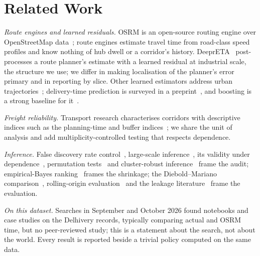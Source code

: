 \section{Related Work}\label{sec:related}

\textit{Route engines and learned residuals.} OSRM is an open-source routing engine over OpenStreetMap data~\cite{luxen2011real}; route engines estimate travel time from road-class speed profiles and know nothing of hub dwell or a corridor's history. DeeprETA~\cite{hu2022deepreta} post-processes a route planner's estimate with a learned residual at industrial scale, the structure we use; we differ in making localisation of the planner's error primary and in reporting by slice. Other learned estimators address urban trajectories~\cite{wang2018learning,wang2018deeptte,derrowpinion2021eta}; delivery-time prediction is surveyed in a preprint~\cite{wen2023survey}, and boosting is a strong baseline for it~\cite{khiari2020boosting}.

\textit{Freight reliability.} Transport research characterises corridors with descriptive indices such as the planning-time and buffer indices~\cite{fhwa2005reliability,jones2005measuring,margiotta2013shrp2}; we share the unit of analysis and add multiplicity-controlled testing that respects dependence.

\textit{Inference.} False discovery rate control~\cite{benjamini1995controlling}, large-scale inference~\cite{efron2010large}, its validity under dependence~\cite{benjamini2001control}, permutation tests~\cite{phipson2010permutation} and cluster-robust inference~\cite{cameron2015practitioner} frame the audit; empirical-Bayes ranking~\cite{efron1975data,morris1983parametric,gelman2007data} frames the shrinkage; the Diebold--Mariano comparison~\cite{diebold1995comparing,harvey1997testing}, rolling-origin evaluation~\cite{tashman2000out,bergmeir2012use} and the leakage literature~\cite{kaufman2012leakage,kapoor2023leakage} frame the evaluation.

\textit{On this dataset.} Searches in September and October 2026 found notebooks and case studies on the Delhivery records, typically comparing actual and OSRM time, but no peer-reviewed study; this is a statement about the search, not about the world. Every result is reported beside a trivial policy computed on the same data.
